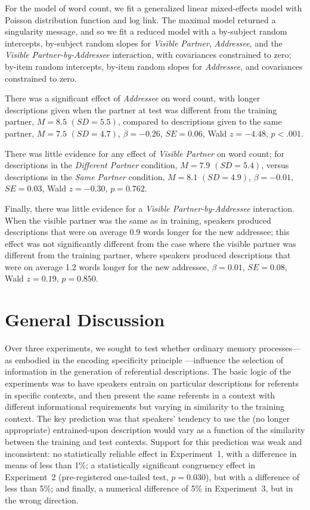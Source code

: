 \documentclass[natbib,doc,a4paper]{apa6}
\begin{document}
For the model of word count, we fit a generalized linear mixed-effects model with Poisson distribution function and log link.  The maximal model returned a singularity message, and so we fit a reduced model with a by-subject random intercepts, by-subject random slopes for \emph{Visible Partner}, \emph{Addressee}, and the \emph{Visible Partner-by-Addressee} interaction, with covariances constrained to zero; by-item random intercepts, by-item random slopes for \emph{Addressee}, and covariances constrained to zero.

There was a significant effect of \emph{Addressee} on word count, with longer descriptions given when the partner at test was different from the training partner,
\(M = 8.5\)  \((SD = 5.5)\),
compared to descriptions given to the same partner,
\(M = 7.5\)  \((SD = 4.7)\),
\(\beta = -0.26\), \(SE = 0.06\), Wald \(z = -4.48\), \(p < .001\).

There was little evidence for any effect of \emph{Visible Partner} on word count; 
for descriptions in the \emph{Different Partner} condition,
\(M = 7.9\)  \((SD = 5.4)\),
versus descriptions in the \emph{Same Partner} condition,
\(M = 8.1\)  \((SD = 4.9)\),
\(\beta = -0.01\), \(SE = 0.03\), Wald \(z = -0.30\), \(p = 0.762\).

Finally, there was little evidence for a \emph{Visible Partner-by-Addressee} interaction. When the visible partner was the same as in training, speakers produced descriptions that were on average 
0.9 
words longer for the new addressee; 
this effect was not significantly different from the case where the visible partner was different from the training partner, where speakers produced descriptions that were on average
1.2
words longer for the new addressee,
\(\beta = 0.01\), \(SE = 0.08\), Wald \(z = 0.19\), \(p = 0.850\).

\section*{General Discussion}
\label{sec:org9dfbb50}
Over three experiments, we sought to test whether ordinary memory processes---as embodied in the encoding specificity principle \citep{tulvingthomson73}---influence the selection of information in the generation of referential descriptions. The basic logic of the experiments was to have speakers entrain on particular descriptions for referents in specific contexts, and then present the same referents in a context with different informational requirements but varying in similarity to the training context. The key prediction was that speakers' tendency to use the (no longer appropriate) entrained-upon description would vary as a function of the similarity between the training and test contexts. Support for this prediction was weak and inconsistent: no statistically reliable effect in Experiment~1, with a difference in means of less than 1\%; a statistically significant congruency effect in Experiment~2 (pre-registered one-tailed test, \(p =\)0.030), but with a difference of less than 5\%; and finally, a numerical difference of 5\% in Experiment~3, but in the wrong direction.
\end{document}

